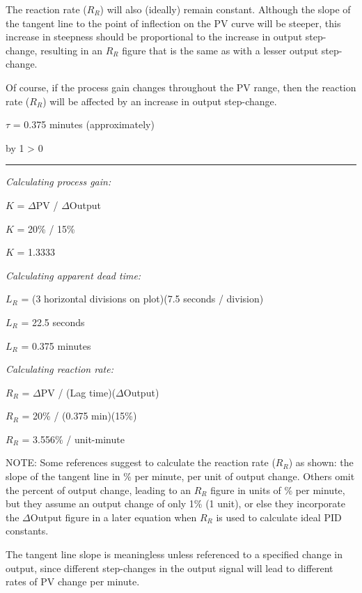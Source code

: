 \documentclass[12pt,a4paper]{article}
\def\notes{
           \advance\explnum by 1
           \ifnum \explnum > 0
                \hrule
                \vskip 3pt
                \leftline{Notes \the\explnum}
                \vskip 3pt \fi}
\begin{document}
The reaction rate ($R_R$) will also (ideally) remain constant.  Although the slope of the tangent line to the point of inflection on the PV curve will be steeper, this increase in steepness should be proportional to the increase in output step-change, resulting in an $R_R$ figure that is the same as with a lesser output step-change.

Of course, if the process gain changes throughout the PV range, then the reaction rate ($R_R$) will be affected by an increase in output step-change.

\vskip 10pt

$\tau$ = 0.375 minutes (approximately)

\vskip 10pt \filbreak 





\notes{} 

{\it Calculating process gain:}

$K$ = $\Delta$PV / $\Delta$Output

$K$ = 20\% / 15\%

$K$ = 1.3333
 
\vskip 10pt

{\it Calculating apparent dead time:}

$L_R$ = (3 horizontal divisions on plot)(7.5 seconds / division)

$L_R$ = 22.5 seconds

$L_R$ = 0.375 minutes
 
\vskip 10pt
 
{\it Calculating reaction rate:}

$R_R$ = $\Delta$PV / (Lag time)($\Delta$Output)

$R_R$ = 20\% / (0.375 min)(15\%)

$R_R$ = 3.556\% / unit-minute
 
\vskip 10pt
 
NOTE: Some references suggest to calculate the reaction rate ($R_R$) as shown: the slope of the tangent line in \% per minute, per unit of output change.  Others omit the percent of output change, leading to an $R_R$ figure in units of \% per minute, but they assume an output change of only 1\% (1 unit), or else they incorporate the $\Delta$Output figure in a later equation when $R_R$ is used to calculate ideal PID constants.  

The tangent line slope is meaningless unless referenced to a specified change in output, since different step-changes in the output signal will lead to different rates of PV change per minute.
\end{document}
